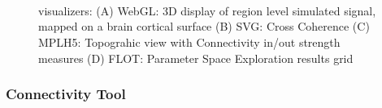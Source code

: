  \begin{figure}[!htbp]
	\\
	\\
	\\
	\caption{\TVB visualizers: 
	(A) WebGL: 3D display of region level simulated signal, mapped on a brain cortical surface
	(B) SVG: Cross Coherence
	(C) MPLH5:  Topograhic view with Connectivity in/out strength measures
	(D) FLOT: Parameter Space Exploration results grid}
        \label{fig:viewers}
\end{figure}

	\subsubsection{Connectivity Tool}

